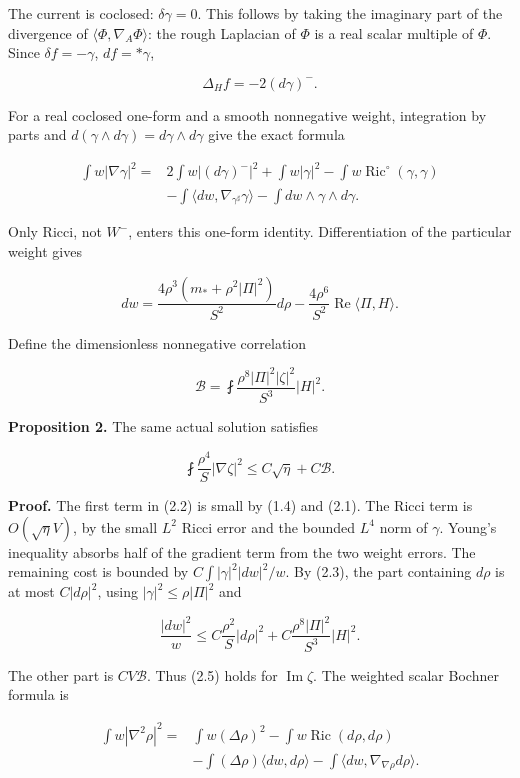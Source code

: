 \documentclass[
  11pt,
]{article}
\begin{document}
The current is coclosed: \(\delta\gamma=0\). This follows by taking the
imaginary part of the divergence of \(\langle\Phi,\nabla_A\Phi\rangle\):
the rough Laplacian of \(\Phi\) is a real scalar multiple of \(\Phi\).
Since \(\delta f=-\gamma\), \(df=*\gamma\),

\[
 \Delta_H f=-2(d\gamma)^-.
 \tag{2.1}
\]

For a real coclosed one-form and a smooth nonnegative weight,
integration by parts and
\(d(\gamma\wedge d\gamma)=d\gamma\wedge d\gamma\) give the exact formula

\[
\begin{aligned}
 \int w|\nabla\gamma|^2={}&2\int w|(d\gamma)^-|^2+
 \int w|\gamma|^2-\int w\operatorname{Ric}^{\circ}(\gamma,\gamma)\\
 &-\int\langle dw,\nabla_{\gamma^\sharp}\gamma\rangle
   -\int dw\wedge\gamma\wedge d\gamma.
\end{aligned}
 \tag{2.2}
\]

Only Ricci, not \(W^-\), enters this one-form identity. Differentiation
of the particular weight gives

\[
 dw=\frac{4\rho^3(m_*+\rho^2|\Pi|^2)}{S^2}d\rho
       -\frac{4\rho^6}{S^2}\operatorname{Re}\langle\Pi,H\rangle.
 \tag{2.3}
\]

Define the dimensionless nonnegative correlation

\[
 \mathcal B=\fint
       \frac{\rho^8|\Pi|^2|\zeta|^2}{S^3}|H|^2.
 \tag{2.4}
\]

\textbf{Proposition 2.} The same actual solution satisfies

\[
 \boxed{\fint \frac{\rho^4}{S}|\nabla\zeta|^2
                         \le C\sqrt\eta+C\mathcal B.}
 \tag{2.5}
\]

\textbf{Proof.} The first term in (2.2) is small by (1.4) and (2.1). The
Ricci term is \(O(\sqrt\eta V)\), by the small \(L^2\) Ricci error and
the bounded \(L^4\) norm of \(\gamma\). Young's inequality absorbs half
of the gradient term from the two weight errors. The remaining cost is
bounded by \(C\int |\gamma|^2|dw|^2/w\). By (2.3), the part containing
\(d\rho\) is at most \(C|d\rho|^2\), using \(|\gamma|^2\le\rho|\Pi|^2\)
and

\[
 \frac{|dw|^2}{w}
 \le C\frac{\rho^2}{S}|d\rho|^2
       +C\frac{\rho^8|\Pi|^2}{S^3}|H|^2.
 \tag{2.6}
\]

The other part is \(C V\mathcal B\). Thus (2.5) holds for
\(\operatorname{Im}\zeta\). The weighted scalar Bochner formula is

\[
\begin{aligned}
 \int w|\nabla^2\rho|^2={}&\int w(\Delta\rho)^2
  -\int w\operatorname{Ric}(d\rho,d\rho)\\
 &-\int(\Delta\rho)\langle dw,d\rho\rangle
  -\int\langle dw,\nabla_{\nabla\rho}d\rho\rangle.
\end{aligned}
 \tag{2.7}
\]
\end{document}
